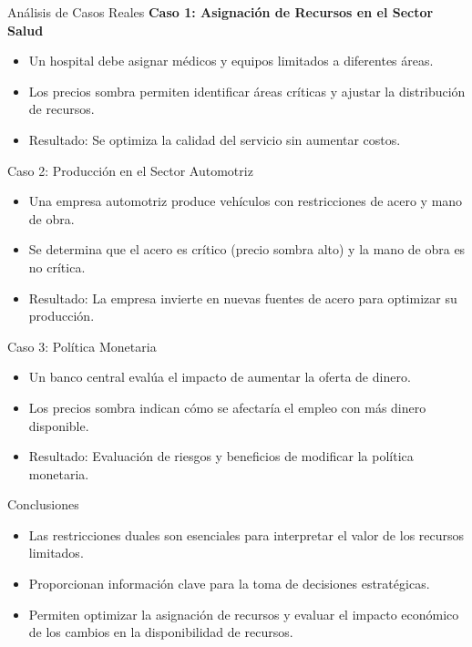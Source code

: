 \documentclass{beamer}
\begin{document}
\begin{frame}{Análisis de Casos Reales}
    \textbf{Caso 1: Asignación de Recursos en el Sector Salud}
    \begin{itemize}
        \item Un hospital debe asignar médicos y equipos limitados a diferentes áreas.
        \item Los precios sombra permiten identificar áreas críticas y ajustar la distribución de recursos.
        \item Resultado: Se optimiza la calidad del servicio sin aumentar costos.
    \end{itemize}
\end{frame}

\begin{frame}{Caso 2: Producción en el Sector Automotriz}
    \begin{itemize}
        \item Una empresa automotriz produce vehículos con restricciones de acero y mano de obra.
        \item Se determina que el acero es crítico (precio sombra alto) y la mano de obra es no crítica.
        \item Resultado: La empresa invierte en nuevas fuentes de acero para optimizar su producción.
    \end{itemize}
\end{frame}

\begin{frame}{Caso 3: Política Monetaria}
    \begin{itemize}
        \item Un banco central evalúa el impacto de aumentar la oferta de dinero.
        \item Los precios sombra indican cómo se afectaría el empleo con más dinero disponible.
        \item Resultado: Evaluación de riesgos y beneficios de modificar la política monetaria.
    \end{itemize}
\end{frame}

\begin{frame}{Conclusiones}
    \begin{itemize}
        \item Las restricciones duales son esenciales para interpretar el valor de los recursos limitados.
        \item Proporcionan información clave para la toma de decisiones estratégicas.
        \item Permiten optimizar la asignación de recursos y evaluar el impacto económico de los cambios en la disponibilidad de recursos.
    \end{itemize}
\end{frame}
\end{document}
